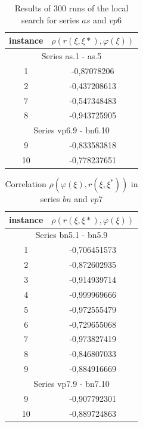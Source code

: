 \documentclass{ifacconf}
\begin{document}
\begin{table}[h!]
	\centering
	\begin{tabular}{|c|c|}
		\hline
		\hspace*{2mm} instance \hspace*{2mm} & \hspace*{1cm} $\rho(r(\xi, \xi*),\varphi(\xi))$\hspace*{1cm}\\
		\hline
		\multicolumn{2}{|c|}{Series as.1 - as.5}\\
		\hline
		1  & -0,87078206\\
		2  & -0,437208613\\
		7  & -0,547348483\\
		8  & -0,943725905\\
		\hline
		\multicolumn{2}{|c|}{Series vp6.9 - bn6.10}\\
		\hline
		9  & -0,833583818\\
		10 & -0,778237651\\
		\hline	
	\end{tabular}
	\vspace{1em}
	\caption{Results of 300 runs of the local search for series $as$ and $vp6$}	\label{res_korr_as_vp}
\end{table}

\begin{table}[h!]
	\centering
	\begin{tabular}{|c|c|}
		\hline
		\hspace*{2mm} instance \hspace*{2mm} & \hspace*{1cm} $\rho(r(\xi, \xi*),\varphi(\xi))$\hspace*{1cm}\\
		\hline
		\multicolumn{2}{|c|}{Series bn5.1 - bn5.9}\\
		\hline
		1  & -0,706451573\\
		2  & -0,872602935\\
		3  & -0,914939714\\
		4  & -0,999969666\\
		5  & -0,972555479\\
		6  & -0,729655068\\
		7  & -0,973827419\\
		8  & -0,846807033\\
		9  & -0,884916669\\
		\hline
		\multicolumn{2}{|c|}{Series vp7.9 - bn7.10}\\
		\hline
		9  & -0,907792301\\
		10 & -0,889724863\\		
		\hline		
	\end{tabular}
	\vspace{1em}
	\caption{Correlation $\rho(\varphi(\xi),r(\xi,\xi^*))$ in series $bn$ and $vp7$}	\label{res_korr_bn_vp}
\end{table}
\end{document}
